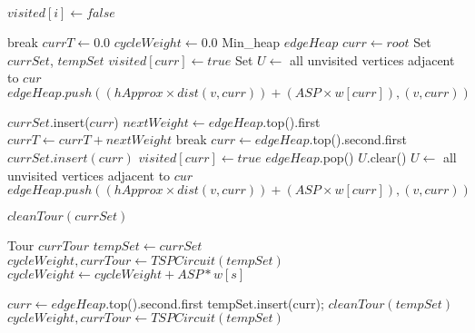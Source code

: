 \begin{algorithm}
\begin{algorithmic}

	\State $visited[i] \gets false$ 
\EndFor

		\State break
	\EndIf
	\State $currT \gets 0.0$ 
	\State $cycleWeight \gets 0.0$ 
	\State Min\_heap $edgeHeap$  
	\State $curr \gets root$ 
	\State Set $currSet$, $tempSet$ 
	\State $visited[curr] \gets true$ 
	\State Set $U \gets$ all unvisited vertices adjacent to $cur$ 
		\State $edgeHeap.push((hApprox \times dist(v,curr)) + (ASP\times w[curr]) , (v,curr))$ 
	\EndFor

	\State $currSet$.insert($curr$) 
		\State $nextWeight \gets edgeHeap$.top().first 
		\State $currT \gets currT + nextWeight$ 
			break 
		\EndIf
		\State $curr \gets edgeHeap$.top().second.first 
		\State $currSet.insert(curr)$ 
		\State $visited[curr] \gets true$ 
		\State $edgeHeap$.pop() 
		\State $U$.clear() 
		\State $U \gets$ all unvisited vertices adjacent to $cur$ 
			\State $edgeHeap.push((hApprox \times dist(v,curr)) + (ASP\times w[curr]) , (v,curr))$ 
		\EndFor
	\EndWhile

	\State $cleanTour(currSet)$
	
	\State Tour $currTour$ 
	\State $tempSet \gets currSet$ 
	\State $cycleWeight , currTour \gets TSPCircuit(tempSet)$
		$cycleWeight \gets cycleWeight + ASP*w[s]$
	\EndFor
	
		\State $curr \gets edgeHeap$.top().second.first 
		\State tempSet.insert(curr);
		\State $cleanTour(tempSet)$
		\State $cycleWeight, currTour \gets TSPCircuit(tempSet)$ 

\end{algorithmic}
\end{algorithm}

